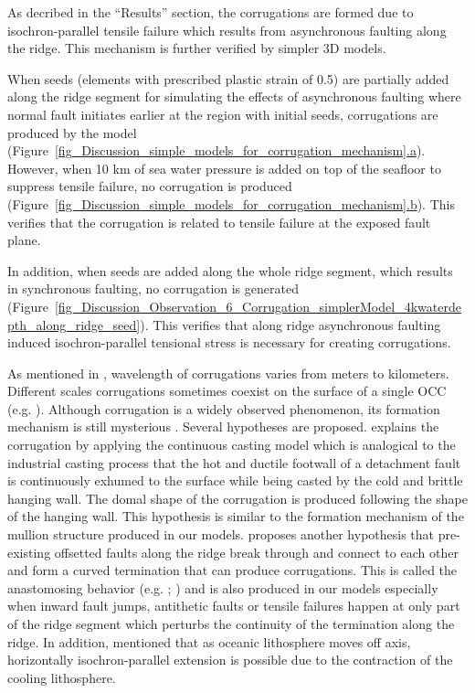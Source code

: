 As decribed in the ``Results'' section, the corrugations are formed due to isochron-parallel tensile failure which results from asynchronous faulting along the ridge. This mechanism is further verified by simpler 3D models.

When seeds (elements with prescribed plastic strain of 0.5) are partially added along the ridge segment for simulating the effects of asynchronous faulting where normal fault initiates earlier at the region with initial seeds, corrugations are produced by the model (Figure~\hyperref[fig_Discussion_simple_models_for_corrugation_mechanism]{\ref{fig_Discussion_simple_models_for_corrugation_mechanism}.a}). 
However, when 10 km of sea water pressure is added on top of the seafloor to suppress tensile failure, no corrugation is produced (Figure~\hyperref[fig_Discussion_simple_models_for_corrugation_mechanism]{\ref{fig_Discussion_simple_models_for_corrugation_mechanism}.b}). This verifies that the corrugation is related to tensile failure at the exposed fault plane.

In addition, when seeds are added along the whole ridge segment, which results in synchronous faulting, no corrugation is generated (Figure~\hyperref[fig_Discussion_Observation_6_Corrugation_simplerModel_4kwaterdepth_along_ridge_seed]{\ref{fig_Discussion_Observation_6_Corrugation_simplerModel_4kwaterdepth_along_ridge_seed}}). This verifies that along ridge asynchronous faulting induced isochron-parallel tensional stress is necessary for creating corrugations.

As mentioned in \citet{Smith2014}, wavelength of corrugations varies from meters to kilometers. Different scales corrugations sometimes coexist on the surface of a single OCC (e.g. \citealp{MacLeod2009}). Although corrugation is a widely observed phenomenon, its formation mechanism is still mysterious \citep{Smith2006}. Several hypotheses are proposed. \citet{Spencer1999} explains the corrugation by applying the continuous casting model which is analogical to the industrial casting process that the hot and ductile footwall of a detachment fault is continuously exhumed to the surface while being casted by the cold and brittle hanging wall. The domal shape of the corrugation is produced following the shape of the hanging wall. This hypothesis is similar to the formation mechanism of the mullion structure produced in our models. \citet{Smith2014} proposes another hypothesis that pre-existing offsetted faults along the ridge break through and connect to each other and form a curved termination that can produce corrugations. This is called the anastomosing behavior (e.g. \citealp{Ferrill1999}; \citealp{Wong2008}) and is also produced in our models especially when inward fault jumps, antithetic faults or tensile failures happen at only part of the ridge segment which perturbs the continuity of the termination along the ridge. In addition, \citet{Tucholke1998} mentioned that %
as oceanic lithosphere moves off axis, horizontally isochron-parallel extension is possible due to the contraction of the cooling lithosphere.

